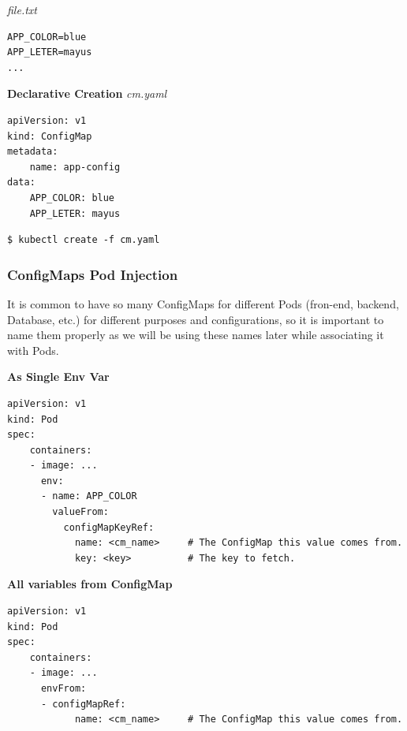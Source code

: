\documentclass{article}
\newenvironment{blocktemplateI}[1]{%
    \tcolorbox[beamer,%
    noparskip,breakable,
    colframe=Violet,%
    colbacklower=Black,%
    title=#1]}%
    {\endtcolorbox}
\newenvironment{codetemplate}[1][]{%
  \mybasecolorbox[#1]
  \itshape
}{%
  \endmybasecolorbox
}
\begin{document}
\begin{codetemplate}{file.txt}
\begin{verbatim}
APP_COLOR=blue
APP_LETER=mayus
...
\end{verbatim}
\end{codetemplate}

\textbf{Declarative Creation}
\begin{codetemplate}{cm.yaml}
\begin{verbatim}
apiVersion: v1
kind: ConfigMap
metadata:
    name: app-config
data:
    APP_COLOR: blue
    APP_LETER: mayus
\end{verbatim}
\end{codetemplate}
\begin{codetemplate}{}
\begin{verbatim}
$ kubectl create -f cm.yaml
\end{verbatim}
\end{codetemplate}


\subsubsection{ConfigMaps Pod Injection}

\begin{blocktemplateI}{NOTE}
It is common to have so many ConfigMaps for different Pods (fron-end, backend, Database, etc.) for different purposes and configurations, so it is important to name them properly as we will be using these names later while associating it with Pods.
\end{blocktemplateI}

\textbf{As Single Env Var}
\begin{codetemplate}{}
\begin{verbatim}
apiVersion: v1
kind: Pod
spec:
    containers:
    - image: ...
      env:
      - name: APP_COLOR
        valueFrom:
          configMapKeyRef:
            name: <cm_name>     # The ConfigMap this value comes from.
            key: <key>          # The key to fetch.
\end{verbatim}
\end{codetemplate}

\textbf{All variables from ConfigMap}
\begin{codetemplate}{}
\begin{verbatim}
apiVersion: v1
kind: Pod
spec:
    containers:
    - image: ...
      envFrom:
      - configMapRef:
            name: <cm_name>     # The ConfigMap this value comes from.
\end{verbatim}
\end{codetemplate}
\end{document}
